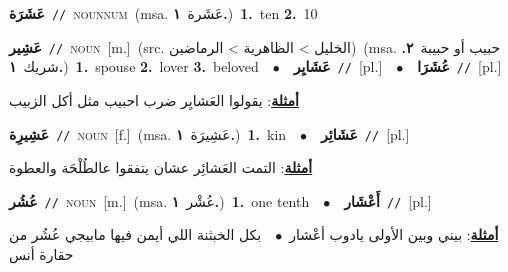 \documentclass[10pt,a4paper,twoside]{article} %
\begin{document}
\begin{multicols}{2}
{\setlength\topsep{0pt}\textbf{\foreignlanguage{arabic}{عَشَرَة}}\ {\color{gray}\texttt{//}\color{black}}\ \textsc{noun\textunderscore num}\ \color{gray}(msa. \foreignlanguage{arabic}{عَشَرة}~\foreignlanguage{arabic}{\textbf{١.}})\color{black}\ \textbf{1.}~ten  \textbf{2.}~10\ } \vspace{2mm}

{\setlength\topsep{0pt}\textbf{\foreignlanguage{arabic}{عَشِير}}\ {\color{gray}\texttt{//}\color{black}}\ \textsc{noun}\ [m.]\ (src. \color{gray}\foreignlanguage{arabic}{الخليل > الظاهرية > الرماضين}\color{black})\ \color{gray}(msa. \foreignlanguage{arabic}{حبيب أو حبيبة}~\foreignlanguage{arabic}{\textbf{٢.}}  \foreignlanguage{arabic}{شريك}~\foreignlanguage{arabic}{\textbf{١.}})\color{black}\ \textbf{1.}~spouse  \textbf{2.}~lover  \textbf{3.}~beloved\ \ $\bullet$\ \ \setlength\topsep{0pt}\textbf{\foreignlanguage{arabic}{عَشَايِر}}\ {\color{gray}\texttt{//}\color{black}}\ [pl.]\ \ $\bullet$\ \ \setlength\topsep{0pt}\textbf{\foreignlanguage{arabic}{عُشَرَا}}\ {\color{gray}\texttt{//}\color{black}}\ [pl.]\  \begin{flushright}\color{gray}\foreignlanguage{arabic}{\textbf{\underline{\foreignlanguage{arabic}{أمثلة}}}: يقولوا العَشايِر ضرب احبيب مثل أكل الزبيب}\end{flushright}\color{black}} \vspace{2mm}

{\setlength\topsep{0pt}\textbf{\foreignlanguage{arabic}{عَشِيرِة}}\ {\color{gray}\texttt{//}\color{black}}\ \textsc{noun}\ [f.]\ \color{gray}(msa. \foreignlanguage{arabic}{عَشِيرَة}~\foreignlanguage{arabic}{\textbf{١.}})\color{black}\ \textbf{1.}~kin\ \ $\bullet$\ \ \setlength\topsep{0pt}\textbf{\foreignlanguage{arabic}{عَشَائِر}}\ {\color{gray}\texttt{//}\color{black}}\ [pl.]\  \begin{flushright}\color{gray}\foreignlanguage{arabic}{\textbf{\underline{\foreignlanguage{arabic}{أمثلة}}}: التمت العَشائِر عشان يتفقوا عالطُلْحَة والعطوة}\end{flushright}\color{black}} \vspace{2mm}

{\setlength\topsep{0pt}\textbf{\foreignlanguage{arabic}{عُشُر}}\ {\color{gray}\texttt{//}\color{black}}\ \textsc{noun}\ [m.]\ \color{gray}(msa. \foreignlanguage{arabic}{عُشْر}~\foreignlanguage{arabic}{\textbf{١.}})\color{black}\ \textbf{1.}~one tenth\ \ $\bullet$\ \ \setlength\topsep{0pt}\textbf{\foreignlanguage{arabic}{أَعْشَار}}\ {\color{gray}\texttt{//}\color{black}}\ [pl.]\  \begin{flushright}\color{gray}\foreignlanguage{arabic}{\textbf{\underline{\foreignlanguage{arabic}{أمثلة}}}: بيني وبين الأولى يادوب أعْشار\ $\bullet$\ \  بكل الخبثنة اللي أيمن فيها مابيجي عُشُر من حقارة أنس}\end{flushright}\color{black}} \vspace{2mm}


\end{multicols}
\end{document}
